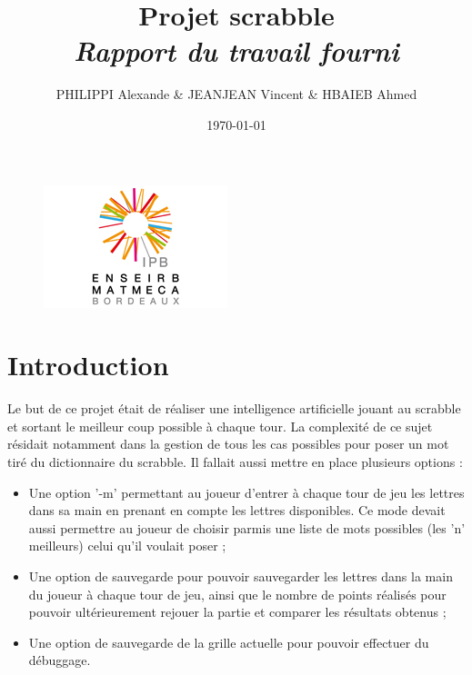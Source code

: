\documentclass[a4paper,8pt,french,fleqn]{article}
\title{\textbf{ Projet scrabble }\\\textit{Rapport du travail fourni}}
\author{PHILIPPI Alexande \& JEANJEAN Vincent \& HBAIEB Ahmed}
\date{\today}
\begin{document}
\begin{figure}[h]
  \begin{center}
    \includegraphics[scale=1.5]{enseirb.jpg}
    \vspace{2cm}
    \maketitle    
  \end{center}
\end{figure}

\newpage

\tableofcontents

\newpage

\section{Introduction}

Le but de ce projet était de réaliser une intelligence artificielle jouant au scrabble et sortant le meilleur coup possible à chaque tour. La complexité de ce sujet résidait notamment dans la gestion de tous les cas possibles pour poser un mot tiré du dictionnaire du scrabble. Il fallait aussi mettre en place plusieurs options : \\

\begin{itemize}

\item Une option '-m' permettant au joueur d'entrer à chaque tour de jeu les lettres dans sa main en prenant en compte les lettres disponibles. Ce mode devait aussi permettre au joueur de choisir parmis une liste de mots possibles (les 'n' meilleurs) celui qu'il voulait poser ; \\

\item Une option de sauvegarde pour pouvoir sauvegarder les lettres dans la main du joueur à chaque tour de jeu, ainsi que le nombre de points réalisés pour pouvoir ultérieurement rejouer la partie et comparer les résultats obtenus ; \\

\item Une option de sauvegarde de la grille actuelle pour pouvoir effectuer du débuggage. \\

\end{itemize}
\end{document}
